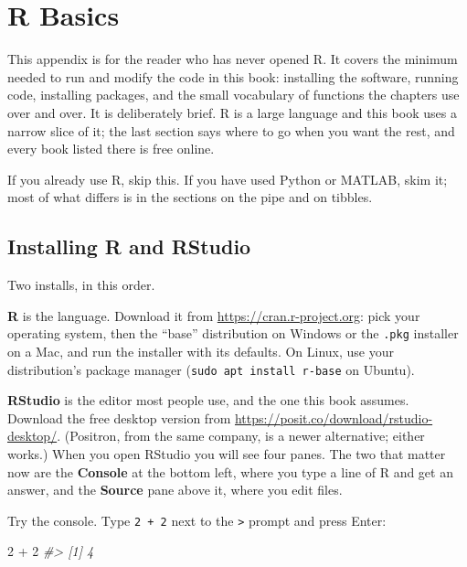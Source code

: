 \documentclass[
  10.5pt,
  letterpaper,
]{scrbook}
\newenvironment{Shaded}{\begin{snugshade}}{\end{snugshade}}
\newcommand{\CommentTok}[1]{\textcolor[rgb]{0.00,0.00,0.00}{\textit{#1}}}
\newcommand{\DecValTok}[1]{\textcolor[rgb]{0.00,0.00,0.00}{#1}}
\newcommand{\SpecialCharTok}[1]{\textcolor[rgb]{0.00,0.00,0.00}{#1}}
\theoremstyle{definition}
\theoremstyle{plain}
\theoremstyle{remark}
\begin{document}
\chapter{R Basics}\label{sec-r-basics}

This appendix is for the reader who has never opened R. It covers the
minimum needed to run and modify the code in this book: installing the
software, running code, installing packages, and the small vocabulary of
functions the chapters use over and over. It is deliberately brief. R is
a large language and this book uses a narrow slice of it; the last
section says where to go when you want the rest, and every book listed
there is free online.

If you already use R, skip this. If you have used Python or MATLAB, skim
it; most of what differs is in the sections on the pipe and on tibbles.

\section{Installing R and RStudio}\label{installing-r-and-rstudio}

Two installs, in this order.

\textbf{R} is the language. Download it from
\url{https://cran.r-project.org}: pick your operating system, then the
``base'' distribution on Windows or the \texttt{.pkg} installer on a
Mac, and run the installer with its defaults. On Linux, use your
distribution's package manager (\texttt{sudo\ apt\ install\ r-base} on
Ubuntu).

\textbf{RStudio} is the editor most people use, and the one this book
assumes. Download the free desktop version from
\url{https://posit.co/download/rstudio-desktop/}. (Positron, from the
same company, is a newer alternative; either works.) When you open
RStudio you will see four panes. The two that matter now are the
\textbf{Console} at the bottom left, where you type a line of R and get
an answer, and the \textbf{Source} pane above it, where you edit files.

Try the console. Type \texttt{2\ +\ 2} next to the
\texttt{\textgreater{}} prompt and press Enter:

\begin{Shaded}
\begin{Highlighting}[]
\DecValTok{2} \SpecialCharTok{+} \DecValTok{2}
\CommentTok{\#\textgreater{} [1] 4}
\end{Highlighting}
\end{Shaded}
\end{document}
